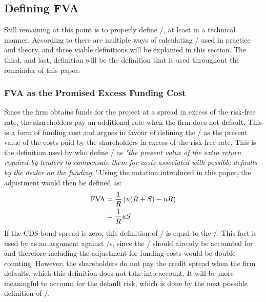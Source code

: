 \documentclass[main.tex]{subfiles}
\begin{document}
    \subsection{Defining FVA}
    \label{sec:defining-fva}
        Still remaining at this point is to properly define \FVA/, at least in a technical manner.
        According to \textcite{ADS2019} there are multiple ways of calculating \FVA/ used in practice and theory,
        and three viable definitions will be explained in this section.
        The third, and last, definition will be the definition that is used throughout
        the remainder of this paper.

        \subsubsection*{FVA as the Promised Excess Funding Cost}
            Since the firm obtains funds for the project at a spread in excess of the risk-free rate, 
            the shareholders pay an additional rate when the firm does not default. 
            This is a form of funding cost and argues in favour of defining the \FVA/ as
            the present value of the costs paid by the shareholders in excess of the risk-free rate.
            This is the definition used by \textcite{HullWhiteFVA} who define \FVA/ as 
            \textit{
                "the present value of the extra return required by lenders to compensate them 
                for costs associated with possible defaults by the dealer on the funding."
            }
            Using the notation introduced in this paper, the adjustment would then be defined as:
                \begin{align}
                    \FVA/ 
                    &= 
                        \discountfactor \left(
                            u (\grossrfrate + S)
                            - u \grossrfrate
                        \right) 
                        \nonumber \\
                    &= 
                        \discountfactor u S
                    \label{eqn:fva-as-promised-excess-funding-cost}
                \end{align}
            If the CDS-bond spread is zero, this definition of \FVA/ is equal to the \DVA/.
            This fact is used by \textcite{HullWhiteFVA} as an argument against \FVA/s,
            since the \DVA/ should already be accounted for and therefore including the adjustment
            for funding costs would be double counting.
            However, the shareholders do not pay the credit spread when the firm defaults,
            which this definition does not take into account.
            It will be more meaningful to account for the default risk, 
            which is done by the next possible definition of \FVA/.
\end{document}
